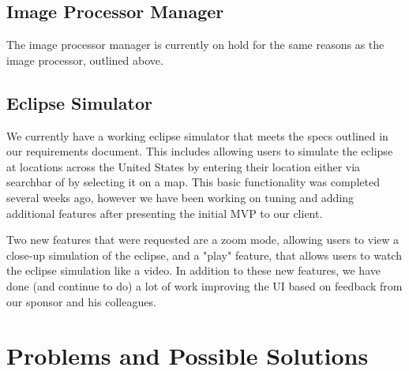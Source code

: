 \documentclass[10pt, onecolumn, draftclsnofoot, letterpaper, compsoc]{IEEEtran}
\begin{document}
\subsection{Image Processor Manager}

The image processor manager is currently on hold for the same reasons as the image processor,
outlined above.

\subsection{Eclipse Simulator}

We currently have a working eclipse simulator that meets the specs outlined in
our requirements document. This includes allowing users to simulate the eclipse
at locations across the United States by entering their location either via searchbar
of by selecting it on a map. This basic functionality was completed several weeks
ago, however we have been working on tuning and adding additional features after
presenting the initial MVP to our client.

Two new features that were requested are a zoom mode, allowing users to view a
close-up simulation of the eclipse, and a "play" feature, that allows users
to watch the eclipse simulation like a video. In addition to these new features,
we have done (and continue to do) a lot of work improving the UI based on feedback
from our sponsor and his colleagues.


\section{Problems and Possible Solutions}
\end{document}
